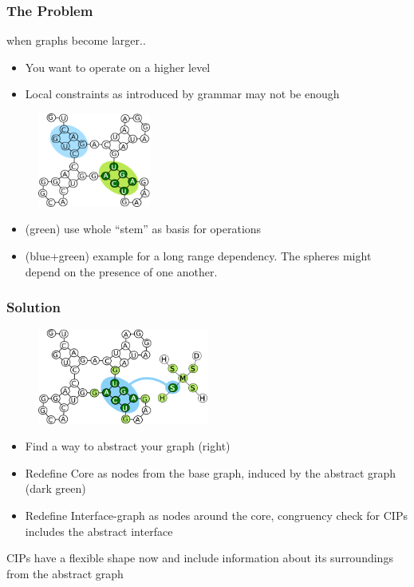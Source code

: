 \documentclass{beamer}
\begin{document}
\begin{frame}
    \frametitle{The Problem}
    when graphs become larger..
    \begin{itemize}
        \item You want to operate on a higher level 
        \item Local constraints as introduced by grammar may not be enough
    \end{itemize}
   \begin{figure}[h!]
        \centering
        \includegraphics[width=0.33\textwidth]{images/longrangedep.png}
    \end{figure}
    
    \begin{itemize}
        \item (green) use whole ``stem'' as basis for operations
        \item (blue+green) example for a long range dependency. The spheres
            might depend on the presence of one another.
    \end{itemize}
\end{frame}



\begin{frame}
    \frametitle{Solution}
   \begin{figure}[ht]
        \centering
        \includegraphics[width=0.50\textwidth]{images/nucip.png}
    \end{figure}
    \begin{itemize}
        \item Find a way to abstract your graph (right)
        \item Redefine Core as nodes from the base graph, induced by the 
            abstract graph (dark green)
        \item Redefine Interface-graph as nodes around the core,
            congruency check for CIPs includes the abstract interface
   \end{itemize}
   CIPs have a flexible shape now and include information about its surroundings
   from the abstract graph
\end{frame}
\end{document}
